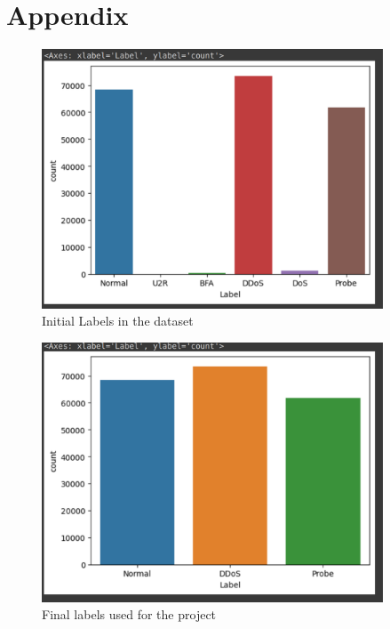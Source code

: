 \chapter{Appendix}
\begin{figure}[tbh] %
	\begin{center}
		\includegraphics[width=4in]{images/labelsBefore.png} 
		\caption{Initial Labels in the dataset} %
		\label{Initial Labels in the dataset} 
	\end{center}
\end{figure}
\begin{figure}[tbh]
	\begin{center}
		\includegraphics[width=4in]{images/labelsAfter.png}
		\caption{Final labels used for the project }
		\label{Final labels used for the project}
	\end{center}
\end{figure}
